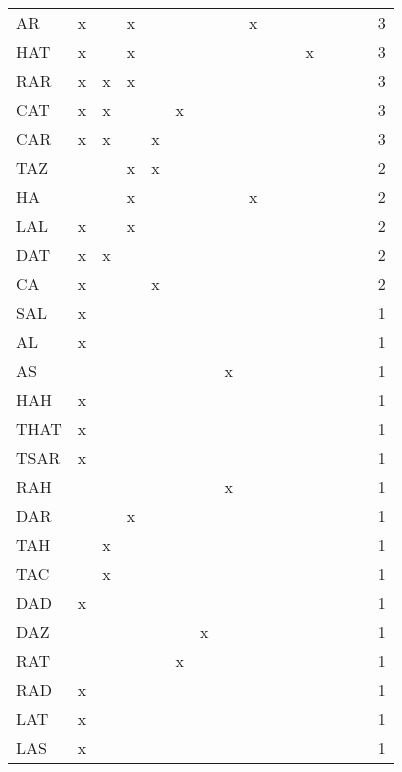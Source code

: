 \begin{table}
\begin{tabularx}{\textwidth}{lXXXXXXXXXXXXXXr}
{AR} & {x} &  & {x} &  &  &  &  & {x} &  &  &  &  &  &  & {3}\\
{HAT} & {x} &  & {x} &  &  &  &  &  &  &  & {x} &  &  &  & {3}\\
{RAR} & {x} & {x} & {x} &  &  &  &  &  &  &  &  &  &  &  & {3}\\
{CAT} & {x} & {x} &  &  & {x} &  &  &  &  &  &  &  &  &  & {3}\\
{CAR} & {x} & {x} &  & {x} &  &  &  &  &  &  &  &  &  &  & {3}\\
{TAZ} &  &  & {x} & {x} &  &  &  &  &  &  &  &  &  &  & {2}\\
{HA} &  &  & {x} &  &  &  &  & {x} &  &  &  &  &  &  & {2}\\
{LAL} & {x} &  & {x} &  &  &  &  &  &  &  &  &  &  &  & {2}\\
{DAT} & {x} & {x} &  &  &  &  &  &  &  &  &  &  &  &  & {2}\\
{CA} & {x} &  &  & {x} &  &  &  &  &  &  &  &  &  &  & {2}\\
{SAL} & {x} &  &  &  &  &  &  &  &  &  &  &  &  &  & {1}\\
{AL} & {x} &  &  &  &  &  &  &  &  &  &  &  &  &  & {1}\\
{AS} &  &  &  &  &  &  & {x} &  &  &  &  &  &  &  & {1}\\
{HAH} & {x} &  &  &  &  &  &  &  &  &  &  &  &  &  & {1}\\
{THAT} & {x} &  &  &  &  &  &  &  &  &  &  &  &  &  & {1}\\
{TSAR} & {x} &  &  &  &  &  &  &  &  &  &  &  &  &  & {1}\\
{RAH} &  &  &  &  &  &  & {x} &  &  &  &  &  &  &  & {1}\\
{DAR} &  &  & {x} &  &  &  &  &  &  &  &  &  &  &  & {1}\\
{TAH} &  & {x} &  &  &  &  &  &  &  &  &  &  &  &  & {1}\\
{TAC} &  & {x} &  &  &  &  &  &  &  &  &  &  &  &  & {1}\\
{DAD} & {x} &  &  &  &  &  &  &  &  &  &  &  &  &  & {1}\\
{DAZ} &  &  &  &  &  & {x} &  &  &  &  &  &  &  &  & {1}\\
{RAT} &  &  &  &  & {x} &  &  &  &  &  &  &  &  &  & {1}\\
{RAD} & {x} &  &  &  &  &  &  &  &  &  &  &  &  &  & {1}\\
{LAT} & {x} &  &  &  &  &  &  &  &  &  &  &  &  &  & {1}\\
{LAS} & {x} &  &  &  &  &  &  &  &  &  &  &  &  &  & {1}\\

\end{tabularx}
\end{table}
